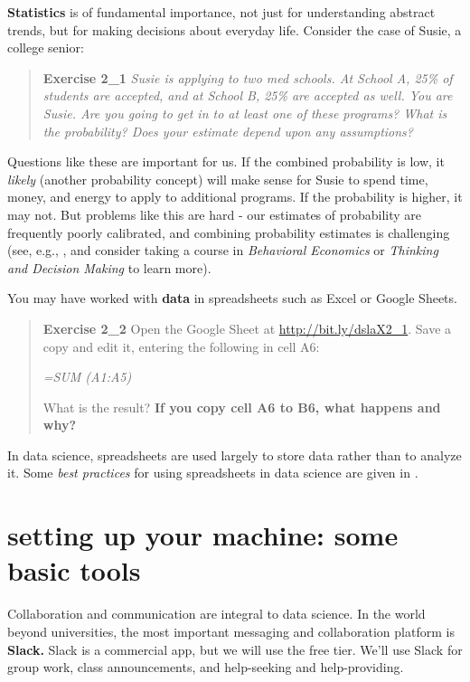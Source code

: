 \documentclass[openany]{book}
\begin{document}
\textbf{Statistics} is of fundamental importance, not just for understanding abstract trends, but for making decisions about everyday life. Consider the case of Susie, a college senior:

\begin{quote}
\textbf{Exercise 2\_1}
\emph{Susie is applying to two med schools. At School A, 25\% of students are accepted, and at School B, 25\% are accepted as well. You are Susie. Are you going to get in to at least one of these programs? What is the probability? Does your estimate depend upon any assumptions?}
\end{quote}

Questions like these are important for us. If the combined probability is low, it \emph{likely} (another probability concept) will make sense for Susie to spend time, money, and energy to apply to additional programs. If the probability is higher, it may not. But problems like this are hard - our estimates of probability are frequently poorly calibrated, and combining probability estimates is challenging (see, e.g., \citet{tversky1974judgment}, and consider taking a course in \emph{Behavioral Economics} or \emph{Thinking and Decision Making} to learn more).

You may have worked with \textbf{data} in spreadsheets such as Excel or Google Sheets.

\begin{quote}
\textbf{Exercise 2\_2}
Open the Google Sheet at \url{http://bit.ly/dslaX2_1}. Save a copy and edit it, entering the following in cell A6:

\emph{=SUM (A1:A5)}

What is the result? \textbf{If you copy cell A6 to B6, what happens and why?}
\end{quote}

In data science, spreadsheets are used largely to store data rather than to analyze it. Some \emph{best practices} for using spreadsheets in data science are given in \citet{broman2017data}.

\hypertarget{setting-up-your-machine-some-basic-tools}{%
\section{setting up your machine: some basic tools}\label{setting-up-your-machine-some-basic-tools}}

Collaboration and communication are integral to data science. In the world beyond universities, the most important messaging and collaboration platform is \textbf{Slack.} Slack is a commercial app, but we will use the free tier. We'll use Slack for group work, class announcements, and help-seeking and help-providing.
\end{document}
